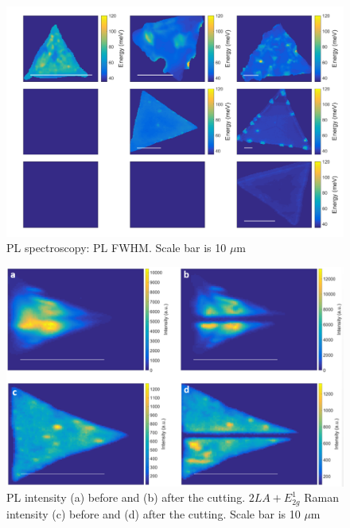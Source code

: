 \documentclass[12pt]{article}
\begin{document}
{\begin{figure}[h]
\begin{center}
\includegraphics[scale=0.3]{PaperSIMapsWidthPL.png}
\caption{PL spectroscopy: PL FWHM. Scale bar is 10 $\mu$m}
\label{fig:PaperSIMapsWidthPL}
\end{center}
\end{figure}

\begin{figure}[h]
\begin{center}
\includegraphics[scale=0.3]{PaperSIMapsCutting.png}
\caption{PL intensity (a) before and (b) after the cutting. $2LA+E^1_{2g}$ Raman intensity (c) before and (d) after the cutting. Scale bar is 10 $\mu$m}
\label{fig:PaperSIMapsCutting}
\end{center}
\end{figure}

}
\end{document}
